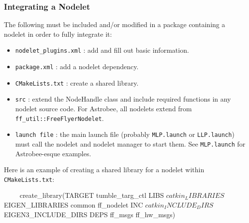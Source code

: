 \documentclass{article}
\begin{document}
\subsubsection{Integrating a Nodelet}
The following must be included and/or modified in a package containing a nodelet in order to fully integrate it:
\begin{itemize}
	\item \texttt{nodelet\_plugins.xml} : add and fill out basic information.
	\item \texttt{package.xml} : add a nodelet dependency.
	\item \texttt{CMakeLists.txt} : create a shared library.
	\item \texttt{src} : extend the NodeHandle class and include required functions in any nodelet source code. For Astrobee, all nodelets extend from \texttt{ff\_util::FreeFlyerNodelet}.
	\item \texttt{launch file} : the main launch file (probably \texttt{MLP.launch} or \texttt{LLP.launch}) must call the nodelet and nodelet manager to start them. See \texttt{MLP.launch} for Astrobee-esque examples.
\end{itemize}

Here is an example of creating a shared library for a nodelet within \texttt{CMakeLists.txt}:

\begin{markdown}
~~~~
create_library(TARGET tumble_targ_ctl
LIBS ${catkin_LIBRARIES} ${EIGEN_LIBRARIES} common ff_nodelet
INC ${catkin_INCLUDE_DIRS} ${EIGEN3_INCLUDE_DIRS}
DEPS ff_msgs ff_hw_msgs)
~~~~
\end{markdown}
\end{document}
